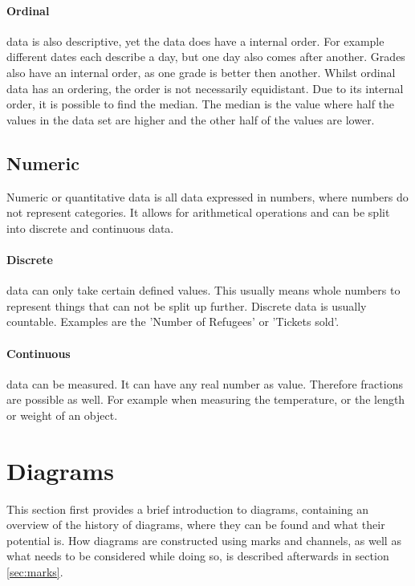 \paragraph{Ordinal}
data is also descriptive, yet the data does have a internal order. For example different dates each describe a day, but one day also comes after another. Grades also have an internal order, as one grade is better then another. Whilst ordinal data has an ordering, the order is not necessarily equidistant. Due to its internal order, it is possible to find the median. The median is the value where half the values in the data set are higher and the other half of the values are lower.

\subsection{Numeric}

Numeric or quantitative data is all data expressed in numbers, where numbers do not represent categories. It allows for arithmetical operations and can be split into discrete and continuous data.

\paragraph{Discrete}
data can only take certain defined values. This usually means whole numbers to represent things that can not be split up further.  Discrete data is usually countable. Examples are the 'Number of Refugees' or 'Tickets sold'.

\paragraph{Continuous}
data can be measured. It can have any real number as value. Therefore fractions are possible as well. For example when measuring the temperature, or the length or weight of an object.


\section{Diagrams}\label{sec:diagrams}
This section first provides a brief introduction to diagrams, containing an overview of the history of diagrams, where they can be found and what their potential is. How diagrams are constructed using marks and channels, as well as what needs to be considered while doing so, is described afterwards in section \ref{sec:marks}.

